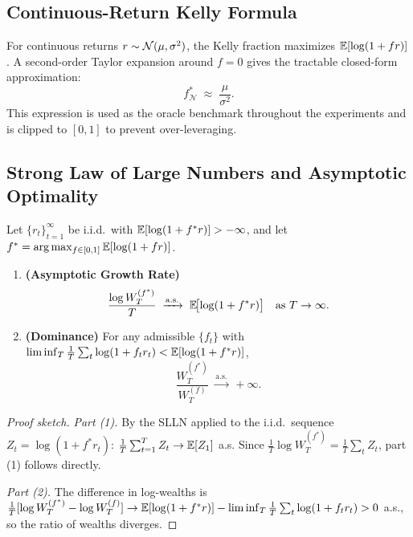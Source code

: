 \subsection{Continuous-Return Kelly Formula}

For continuous returns $r \sim \mathcal{N}(\mu,\sigma^2)$, the Kelly fraction
maximizes $\mathbb{E}[\log(1+fr)]$.  A second-order Taylor expansion around $f=0$
gives the tractable closed-form approximation:
\begin{equation}
    f^*_{\mathcal{N}} \;\approx\; \frac{\mu}{\sigma^2}.
    \label{eq:gaussian_kelly}
\end{equation}
This expression is used as the oracle benchmark throughout the experiments
and is clipped to $[0,1]$ to prevent over-leveraging.

\subsection{Strong Law of Large Numbers and Asymptotic Optimality}

\begin{theorem}
\label{thm:kelly_slln}
Let $\{r_t\}_{t=1}^\infty$ be i.i.d.\ with
$\mathbb{E}[\log(1+f^*r)] > -\infty$, and let
$f^* = \arg\max_{f\in[0,1]}\mathbb{E}[\log(1+fr)]$.
\begin{enumerate}
    \item \textbf{(Asymptotic Growth Rate)}
    \[
        \frac{\log W_T^{(f^*)}}{T}
        \;\xrightarrow{\mathrm{a.s.}}\;
        \mathbb{E}\!\bigl[\log(1+f^*r)\bigr]
        \quad\text{as } T\to\infty.
    \]
    \item \textbf{(Dominance)} For any admissible $\{f_t\}$ with
    $\liminf_T \frac{1}{T}\sum_t \log(1+f_t r_t)
    < \mathbb{E}[\log(1+f^*r)]$,
    \[
        \frac{W_T^{(f^*)}}{W_T^{(f)}}
        \;\xrightarrow{\mathrm{a.s.}}\; +\infty.
    \]
\end{enumerate}
\end{theorem}

\begin{proof}[Proof sketch]
\textit{Part (1).}  By the SLLN applied to the i.i.d.\ sequence
$Z_t = \log(1+f^*r_t)$:
$\frac{1}{T}\sum_{t=1}^T Z_t \to \mathbb{E}[Z_1]$ a.s.
Since $\frac{1}{T}\log W_T^{(f^*)} = \frac{1}{T}\sum_t Z_t$, part (1)
follows directly.

\textit{Part (2).}  The difference in log-wealths is
$\frac{1}{T}[\log W_T^{(f^*)} - \log W_T^{(f)}]
\to \mathbb{E}[\log(1+f^*r)] - \liminf_T\frac{1}{T}\sum_t\log(1+f_t r_t) > 0$
a.s., so the ratio of wealths diverges.
\end{proof}

